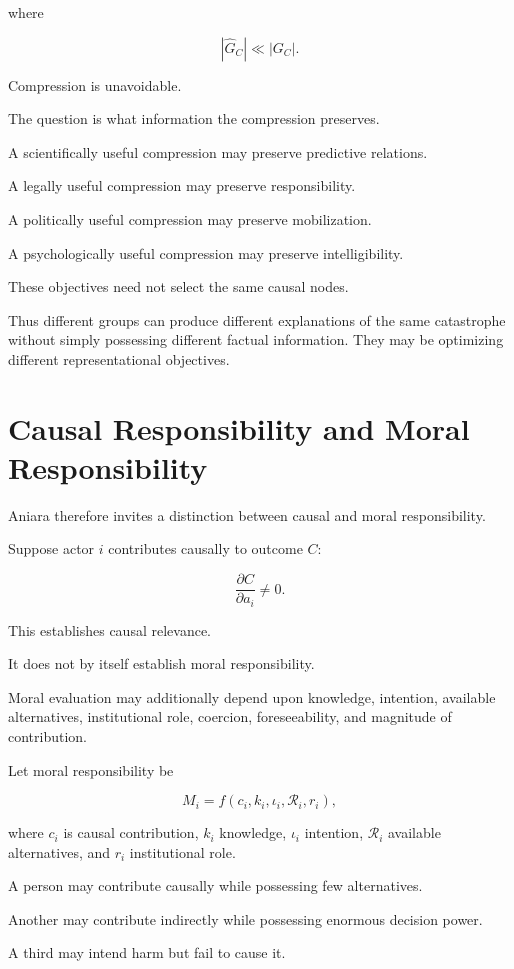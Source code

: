 \documentclass[11pt,oneside]{book}
\theoremstyle{definition}
\theoremstyle{remark}
\newcommand{\R}{\mathcal{R}}
\begin{document}
where

\[
|\widehat G_C|\ll|G_C|.
\]

Compression is unavoidable.

The question is what information the compression preserves.

A scientifically useful compression may preserve predictive relations.

A legally useful compression may preserve responsibility.

A politically useful compression may preserve mobilization.

A psychologically useful compression may preserve intelligibility.

These objectives need not select the same causal nodes.

Thus different groups can produce different explanations of the same catastrophe without simply possessing different factual information. They may be optimizing different representational objectives.

\section{Causal Responsibility and Moral Responsibility}

Aniara therefore invites a distinction between causal and moral responsibility.

Suppose actor \(i\) contributes causally to outcome \(C\):

\[
\frac{\partial C}{\partial a_i}\neq0.
\]

This establishes causal relevance.

It does not by itself establish moral responsibility.

Moral evaluation may additionally depend upon knowledge, intention, available alternatives, institutional role, coercion, foreseeability, and magnitude of contribution.

Let moral responsibility be

\[
M_i
=
f(
c_i,
k_i,
\iota_i,
\R_i,
r_i
),
\]

where \(c_i\) is causal contribution, \(k_i\) knowledge, \(\iota_i\) intention, \(\R_i\) available alternatives, and \(r_i\) institutional role.

A person may contribute causally while possessing few alternatives.

Another may contribute indirectly while possessing enormous decision power.

A third may intend harm but fail to cause it.
\end{document}
